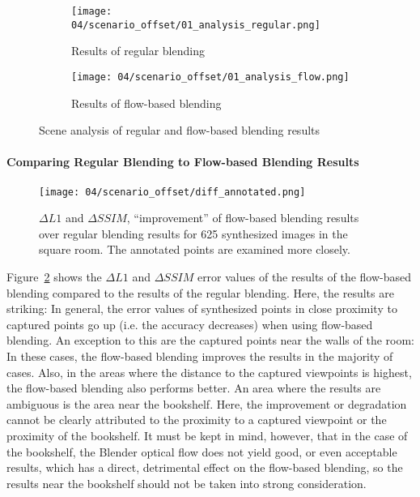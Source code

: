 \begin{figure}
\centering
    \hfill
    \begin{subfigure}[b]{0.45\textwidth}
            \centering
            \texttt{[image: 04/scenario\_offset/01\_analysis\_regular.png]}
            \caption{Results of regular blending}
    \end{subfigure}
    \hfill
    \begin{subfigure}[b]{0.45\textwidth}
            \centering
            \texttt{[image: 04/scenario\_offset/01\_analysis\_flow.png]}
            \caption{Results of flow-based blending}
    \end{subfigure}
    \hfill
  \caption{Scene analysis of regular and flow-based blending results} \label{fig:offset_regular_flow}
\end{figure}

\paragraph{Comparing Regular Blending to Flow-based Blending Results}

\begin{figure}
		\centering
		\texttt{[image: 04/scenario\_offset/diff\_annotated.png]}
		\caption[$\Delta L1$ and $\Delta SSIM$, ``improvement'' of flow-based blending results over regular blending results for 625 synthesized images]{$\Delta L1$ and $\Delta SSIM$, ``improvement'' of flow-based blending results over regular blending results for 625 synthesized images in the square room. The annotated points are examined more closely.}
		\label{fig:scenario_offset_diff}
\end{figure}

Figure~\ref{fig:scenario_offset_diff} shows the $\Delta L1$ and $\Delta SSIM$ error values of the results of the flow-based blending compared to the results of the regular blending. Here, the results are striking: In general, the error values of synthesized points in close proximity to captured points go up (i.e. the accuracy decreases) when using flow-based blending. An exception to this are the captured points near the walls of the room: In these cases, the flow-based blending improves the results in the majority of cases. Also, in the areas where the distance to the captured viewpoints is highest, the flow-based blending also performs better. An area where the results are ambiguous is the area near the bookshelf. Here, the improvement or degradation cannot be clearly attributed to the proximity to a captured viewpoint or the proximity of the bookshelf. It must be kept in mind, however, that in the case of the bookshelf, the Blender optical flow does not yield good, or even acceptable results, which has a direct, detrimental effect on the flow-based blending, so the results near the bookshelf should not be taken into strong consideration.

